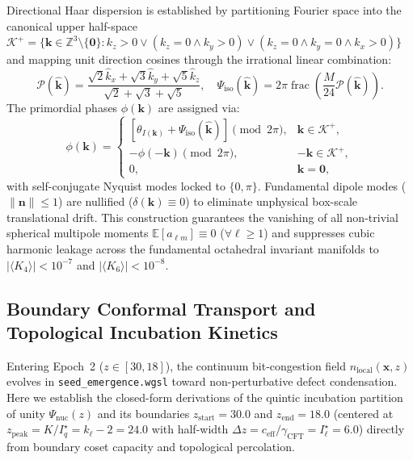 \documentclass[11pt,letterpaper]{article}
\theoremstyle{plain}
\DeclareRobustCommand{\pyvar}[1]{%
  \ifmmode\text{\nolinkurl{#1}}\else\nolinkurl{#1}\fi%
}
\begin{document}
Directional Haar dispersion is established by partitioning Fourier space into the canonical upper half-space $\mathcal{K}^+ = \{\mathbf{k} \in \mathbb{Z}^3 \setminus \{\mathbf{0}\} : k_z > 0 \lor (k_z = 0 \land k_y > 0) \lor (k_z = 0 \land k_y = 0 \land k_x > 0)\}$ and mapping unit direction cosines through the irrational linear combination:
\begin{equation}
    \mathcal{P}(\hat{\mathbf{k}}) = \frac{\sqrt{2}\hat{k}_x + \sqrt{3}\hat{k}_y + \sqrt{5}\hat{k}_z}{\sqrt{2} + \sqrt{3} + \sqrt{5}}, \quad \Psi_{\text{iso}}(\hat{\mathbf{k}}) = 2\pi \operatorname{frac}\left( \frac{M}{24} \mathcal{P}(\hat{\mathbf{k}}) \right).
\end{equation}
The primordial phases $\phi(\mathbf{k})$ are assigned via:
\begin{equation}
    \phi(\mathbf{k}) = \begin{cases}
        \left[ \theta_{I(\mathbf{k})} + \Psi_{\text{iso}}(\hat{\mathbf{k}}) \right] \pmod{2\pi}, & \mathbf{k} \in \mathcal{K}^+, \\
        -\phi(-\mathbf{k}) \pmod{2\pi}, & -\mathbf{k} \in \mathcal{K}^+, \\
        0, & \mathbf{k} = \mathbf{0},
    \end{cases}
\end{equation}
with self-conjugate Nyquist modes locked to $\{0, \pi\}$. Fundamental dipole modes ($\|\mathbf{n}\| \le 1$) are nullified ($\delta(\mathbf{k}) \equiv 0$) to eliminate unphysical box-scale translational drift. This construction guarantees the vanishing of all non-trivial spherical multipole moments $\mathbb{E}[a_{\ell m}] \equiv 0$ ($\forall \ell \ge 1$) and suppresses cubic harmonic leakage across the fundamental octahedral invariant manifolds to $|\langle K_4 \rangle| < 10^{-7}$ and $|\langle K_6 \rangle| < 10^{-8}$.


\subsection{Boundary Conformal Transport and Topological Incubation Kinetics}
\label{sec:boundary-conformal-transport}

Entering Epoch~2 ($z \in [30, 18]$), the continuum bit-congestion field $n_{\mathrm{local}}(\mathbf{x}, z)$ evolves in \pyvar{seed_emergence.wgsl} toward non-perturbative defect condensation. Here we establish the closed-form derivations of the quintic incubation partition of unity $\Psi_{\mathrm{nuc}}(z)$ and its boundaries $z_{\mathrm{start}} = 30.0$ and $z_{\mathrm{end}} = 18.0$ (centered at $z_{\mathrm{peak}} = K/I_q^\star = k_\ell - 2 = 24.0$ with half-width $\Delta z = c_{\mathrm{eff}}/\gamma_{\mathrm{CFT}} = I_\ell^\star = 6.0$) directly from boundary coset capacity and topological percolation.
\end{document}
